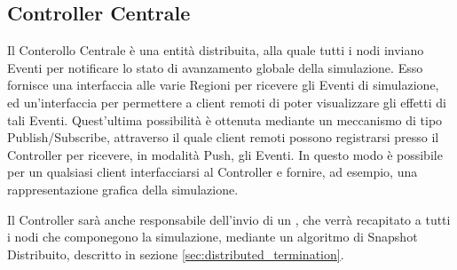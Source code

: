 	\subsection{Controller Centrale}
		
	Il Conterollo Centrale è una entità distribuita, alla quale tutti i nodi inviano Eventi per notificare lo stato di avanzamento globale della simulazione. Esso fornisce una interfaccia alle varie Regioni per ricevere gli Eventi di simulazione, ed un'interfaccia per permettere a client remoti di poter visualizzare gli effetti di tali Eventi. Quest'ultima possibilità è ottenuta mediante un meccanismo di tipo Publish/Subscribe, attraverso il quale client remoti possono registrarsi presso il Controller per ricevere, in modalità Push, gli Eventi.
	In questo modo è possibile per un qualsiasi client interfacciarsi al Controller e fornire, ad esempio, una rappresentazione grafica della simulazione.

	Il Controller sarà anche responsabile dell'invio di un , che verrà recapitato a tutti i nodi che componegono la simulazione, mediante un algoritmo di Snapshot Distribuito, descritto in sezione \ref{sec:distributed_termination}.
\newpage
